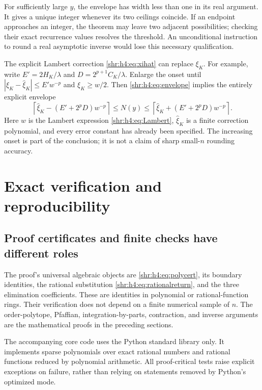 \documentclass[11pt,letterpaper]{article}
\numberwithin{equation}{section}
\theoremstyle{definition}
\newcommand{\1}{\mathbf 1}
\begin{document}
For sufficiently large $y$, the envelope has width less than one in its
real argument. It gives a unique integer whenever its two ceilings
coincide. If an endpoint approaches an integer, the theorem may leave two
adjacent possibilities; checking their exact recurrence values resolves
the threshold. An unconditional instruction to round a real asymptotic
inverse would lose this necessary qualification.

The explicit Lambert correction \eqref{shr:h4:eq:xihat} can replace $\xi_K$.
For example, write $E'=2H_K/\lambda$ and
$D=2^{p+1}C_K/\lambda$. Enlarge the onset until
$|\xi_K-\widehat\xi_K|\le E'w^{-p}$ and $\xi_K\ge w/2$.
Then \eqref{shr:h4:eq:envelope} implies the entirely explicit envelope
\begin{equation}
 \left\lceil\widehat\xi_K-(E'+2^pD)w^{-p}\right\rceil
 \le N(y)\le
 \left\lceil\widehat\xi_K+(E'+2^pD)w^{-p}\right\rceil.
 \label{shr:h4:eq:lambertenvelope}
\end{equation}
Here $w$ is the Lambert expression \eqref{shr:h4:eq:Lambert}, $\widehat\xi_K$
is a finite correction polynomial, and every error constant has already
been specified. The increasing onset is part of the conclusion; it is
not a claim of sharp small-$n$ rounding accuracy.

\section{Exact verification and reproducibility}
\label{shr:h4:sec:verification}
\subsection{Proof certificates and finite checks have different roles}
The proof's universal algebraic objects are \eqref{shr:h4:eq:polycert}, its
boundary identities, the rational substitution
\eqref{shr:h4:eq:rationalreturn}, and the three elimination coefficients.
These are identities in polynomial or rational-function rings. Their
verification does not depend on a finite numerical sample of $n$.
The order-polytope, Pfaffian, integration-by-parts, contraction, and
inverse arguments are the mathematical proofs in the preceding sections.

The accompanying core code uses the Python standard library only. It
implements sparse polynomials over exact rational numbers and rational
functions reduced by polynomial arithmetic. All proof-critical tests
raise explicit exceptions on failure, rather than relying on statements
removed by Python's optimized mode.
\end{document}
